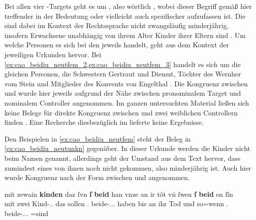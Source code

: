Bei allen vier -Targets geht es um , also wörtlich
, wobei dieser Begriff gemäß \citet[\pno~]{lexer:mhdhwb}
hier treffender in der Bedeutung 
 oder vielleicht
auch spezifischer 
 aufzufassen ist.
Die  sind dabei im Kontext der Rechtssprache nicht zwangsläufig
minderjährig, insofern Erwachsene unabhängig von ihrem Alter Kinder ihrer
Eltern sind \autocites[vgl.][1736]{schwab2012}[siehe
auch][258--259]{birkenesfleischer2022}. Um welche Personen es sich bei den
 jeweils handelt, geht aus dem Kontext der jeweiligen Urkunden
hervor. Bei \cref{ex:cao_beidiu_neutfem_2,ex:cao_beidiu_neutfem_3} handelt es
sich um die gleichen Personen, die Schwestern Gertraut und Diemut, Töchter des
Wernher vom Stein und Mitglieder des Konvents von Engelthal
\autocite[Kr.~Nürnberger Land; vgl.][619]{caor}.
%
Die Kongruenz zwischen  und   wurde hier
jeweils aufgrund der Nähe zwischen pronominalem Target und nominalem Controller
angenommen. Im ganzen unter\-suchten Material ließen sich keine Belege für
direkte Kongruenz zwischen  und zwei weiblichen Controllern finden%
. Eine Recherche diesbezüglich im
\REM{} lieferte keine Ergeb\-nisse.

Den Beispielen in \cref{ex:cao_beidiu_neutfem} steht der Beleg in
\cref{ex:cao_beidiu_neutunkn} gegenüber. In dieser Urkunde werden die Kinder
nicht beim Namen genannt, allerdings geht der Umstand aus dem Text hervor, dass
zumindest eines von ihnen noch nicht   \autocites[\pno~214, 218.18--19]{cao1}[vgl.][26]{caor} gekommen, also
minderjährig ist. Auch hier wurde Kongruenz nach der Form zwischen
  und  angenommen.

\begin{exe}
\ex \label{ex:cao_beidiu_neutunkn}
	\gll mit zewain \textbf{kinden} \textelp{} daz ſvn \textbf{ſ}
		\textbf{beid} han vnze an ir tôt \textelp{} vn̄ ſwen
		\textbf{ſ} \textbf{beid} {en ſîn}
		\textelp{} \\
		mit zwei Kind-\Dat.\Pl.\NeutX{} {} das sollen
		\Tpl\tsub{\SX}.\Nom{} beide-\Nom.\Pl.\NeutX.\St{} haben bis an ihr
		Tod {} und so=wenn \Tpl\tsub{\SX}.\Nom{}
		beide-\Nom.\Pl.\NeutX.\St{} \Neg=sind {} \\
	\begin{taggedline}{\parencites(Rottweil, 1274)[\pno~214, 218.17--24]{cao1}}
	\trans {}
	\end{taggedline}
\end{exe}

